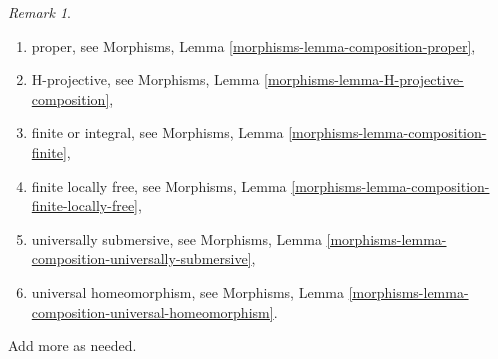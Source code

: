 \documentclass{stacks-project}
\theoremstyle{plain}
\theoremstyle{definition}
\theoremstyle{remark}
\newtheorem{remark}[subsection]{Remark}
\numberwithin{equation}{subsection}
\begin{document}
\begin{remark}
\begin{enumerate}
Morphisms, Lemma \ref{morphisms-lemma-composition-etale},
\item proper, see
Morphisms, Lemma \ref{morphisms-lemma-composition-proper},
\item H-projective, see
Morphisms, Lemma \ref{morphisms-lemma-H-projective-composition},
\item finite or integral, see
Morphisms, Lemma \ref{morphisms-lemma-composition-finite},
\item finite locally free, see
Morphisms, Lemma \ref{morphisms-lemma-composition-finite-locally-free},
\item universally submersive, see
Morphisms, Lemma \ref{morphisms-lemma-composition-universally-submersive},
\item universal homeomorphism, see
Morphisms, Lemma \ref{morphisms-lemma-composition-universal-homeomorphism}.
\end{enumerate}
Add more as needed.
\end{remark}
\end{document}
